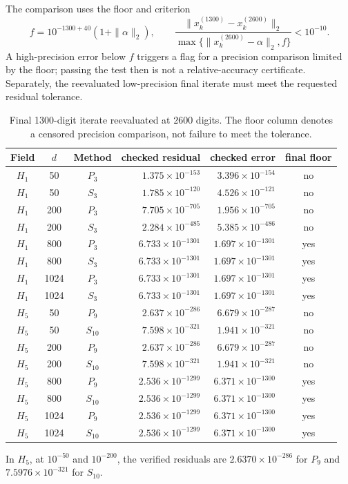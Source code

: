 \documentclass[11pt]{article}
\begin{document}
The comparison uses the floor and criterion
\[
 f=10^{-1300+40}(1+\|\alpha\|_2),\qquad
 \frac{\|x_k^{(1300)}-x_k^{(2600)}\|_2}{\max\{\|x_k^{(2600)}-\alpha\|_2,f\}}<10^{-10}.
\]
A high-precision error below $f$ triggers a flag for a precision comparison limited by the floor; passing the test then is not a relative-accuracy certificate. Separately, the reevaluated low-precision final iterate must meet the requested residual tolerance.
\begin{table}[htbp]\centering\scriptsize
\caption{Final 1300-digit iterate reevaluated at 2600 digits. The floor column denotes a censored precision comparison, not failure to meet the tolerance.}\label{tab:mp-precision}
\begin{tabular}{cccrrc}\toprule
Field & $d$ & Method & checked residual & checked error & final floor\\\midrule
$H_{1}$ & 50 & $P_{3}$ & $1.375\times10^{-153}$ & $3.396\times10^{-154}$ & no\\
$H_{1}$ & 50 & $S_{3}$ & $1.785\times10^{-120}$ & $4.526\times10^{-121}$ & no\\
$H_{1}$ & 200 & $P_{3}$ & $7.705\times10^{-705}$ & $1.956\times10^{-705}$ & no\\
$H_{1}$ & 200 & $S_{3}$ & $2.284\times10^{-485}$ & $5.385\times10^{-486}$ & no\\
$H_{1}$ & 800 & $P_{3}$ & $6.733\times10^{-1301}$ & $1.697\times10^{-1301}$ & yes\\
$H_{1}$ & 800 & $S_{3}$ & $6.733\times10^{-1301}$ & $1.697\times10^{-1301}$ & yes\\
$H_{1}$ & 1024 & $P_{3}$ & $6.733\times10^{-1301}$ & $1.697\times10^{-1301}$ & yes\\
$H_{1}$ & 1024 & $S_{3}$ & $6.733\times10^{-1301}$ & $1.697\times10^{-1301}$ & yes\\
\midrule
$H_{5}$ & 50 & $P_{9}$ & $2.637\times10^{-286}$ & $6.679\times10^{-287}$ & no\\
$H_{5}$ & 50 & $S_{10}$ & $7.598\times10^{-321}$ & $1.941\times10^{-321}$ & no\\
$H_{5}$ & 200 & $P_{9}$ & $2.637\times10^{-286}$ & $6.679\times10^{-287}$ & no\\
$H_{5}$ & 200 & $S_{10}$ & $7.598\times10^{-321}$ & $1.941\times10^{-321}$ & no\\
$H_{5}$ & 800 & $P_{9}$ & $2.536\times10^{-1299}$ & $6.371\times10^{-1300}$ & yes\\
$H_{5}$ & 800 & $S_{10}$ & $2.536\times10^{-1299}$ & $6.371\times10^{-1300}$ & yes\\
$H_{5}$ & 1024 & $P_{9}$ & $2.536\times10^{-1299}$ & $6.371\times10^{-1300}$ & yes\\
$H_{5}$ & 1024 & $S_{10}$ & $2.536\times10^{-1299}$ & $6.371\times10^{-1300}$ & yes\\
\bottomrule\end{tabular}\end{table}
\FloatBarrier
In $H_5$, at $10^{-50}$ and $10^{-200}$, the verified residuals are $2.6370\times10^{-286}$ for $P_9$ and $7.5976\times10^{-321}$ for $S_{10}$.
\end{document}
